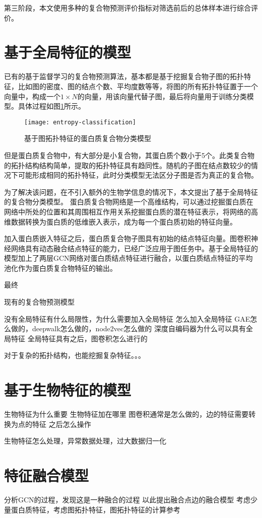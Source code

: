 第三阶段，本文使用多种的复合物预测评价指标对筛选前后的总体样本进行综合评价。


\section{基于全局特征的模型}
\label{section:GlobalfeatBaseModel}
已有的基于监督学习的复合物预测算法，基本都是基于挖掘复合物子图的拓扑特征，比如图的密度、图的结点个数、平均度数等等，将图的所有拓扑特征置于一个向量中，构成一个$1\times N$的向量，用该向量代替子图，最后将向量用于训练分类模型。具体过程如图\ref{fig:entropy-classification}所示。

\begin{figure}[htbp]
    \centering
    \texttt{[image: entropy-classification]}
    \caption{基于图拓扑特征的蛋白质复合物分类模型}
    \label{fig:entropy-classification}
\end{figure}


但是蛋白质复合物中，有大部分是小复合物，其蛋白质个数小于5个。此类复合物的拓扑结构结构简单，提取的拓扑特征具有趋同性。随机的子图在结点数较少的情况下可能形成相同的拓扑特征，此时分类模型无法区分子图是否为真正的复合物。

为了解决该问题，在不引入额外的生物学信息的情况下，本文提出了基于全局特征的复合物分类模型。
蛋白质复合物网络是一个高维结构，可以通过挖掘蛋白质在网络中所处的位置和其周围相互作用关系挖掘蛋白质的潜在特征表示，将网络的高维数据转换为蛋白质的低维嵌入表示，成为每一个蛋白质初始的特征向量。

加入蛋白质嵌入特征之后，蛋白质复合物子图具有初始的结点特征向量。图卷积神经网络\label{subsection:GCN}具有动态融合结点特征的能力，已经广泛应用于图任务中。基于全局特征的模型加上了两层GCN网络对蛋白质结点特征进行融合，以蛋白质结点特征的平均池化作为蛋白质复合物特征的输出。

最终


现有的复合物预测模型


没有全局特征有什么局限性，为什么需要加入全局特征
怎么加入全局特征
GAE怎么做的，deepwalk怎么做的，node2vec怎么做的
深度自编码器为什么可以具有全局特征
全局特征具有之后，图卷积怎么进行的

对于复杂的拓扑结构，也能挖掘复杂特征。。。


\section{基于生物特征的模型}
\label{section:biofeatBaseModel}
生物特征为什么重要
生物特征加在哪里
图卷积通常是怎么做的，边的特征需要转换为点的特征
之后怎么操作

生物特征怎么处理，异常数据处理，过大数据归一化

\section{特征融合模型}
\label{section:fusionfeatBaseModel}
分析GCN的过程，发现这是一种融合的过程
以此提出融合点边的融合模型
考虑少量蛋白质特征，考虑图拓扑特征，图拓扑特征的计算参考\cite{yu_predicting_2014}
